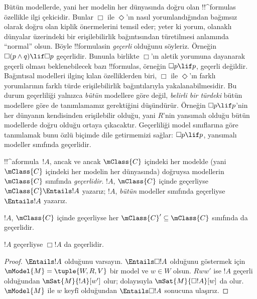 \documentclass[../../../include/open-logic-section]{subfiles}
\begin{document}


\begin{explain}
  Bütün modellerde, yani her modelin her dünyasında doğru olan
  !!^{formula}s özellikle ilgi çekicidir. Bunlar $\Box$ ile $\Diamond$'ın
  nasıl yorumlandığından bağımsız olarak doğru olan kiplik önermelerini
  temsil eder; yeter ki yorum, olanaklı dünyalar üzerindeki bir
  erişilebilirlik bağıntısından türetilmesi anlamında ``normal'' olsun. Böyle
  !!{formula}s{}in \emph{geçerli} olduğunu söyleriz. Örneğin
  $\Box(p \land q) \lif \Box p$ geçerlidir. Bununla birlikte $\Box$'ın
  aletik yorumuna dayanarak geçerli olması beklenebilecek bazı !!{formula}s,
  örneğin $\Box p \lif p$, geçerli değildir. Bağıntısal modelleri ilginç
  kılan özelliklerden biri, $\Box$ ile $\Diamond$'ın farklı yorumlarının
  farklı türde erişilebilirlik bağıntılarıyla yakalanabilmesidir. Bu durum
  geçerliliği yalnızca \emph{bütün} modellere göre değil, \emph{belirli bir
  türdeki} bütün modellere göre de tanımlamamız gerektiğini düşündürür.
  Örneğin $\Box p \lif p$'nin her dünyanın kendisinden erişilebilir olduğu,
  yani $R$'nin yansımalı olduğu bütün modellerde doğru olduğu ortaya
  çıkacaktır. Geçerliliği model sınıflarına göre tanımlamak bunu özlü biçimde
  dile getirmemizi sağlar: $\Box p \lif p$, yansımalı modeller sınıfında
  geçerlidir.
\end{explain}

\begin{defn}
  !!^a{formula}~$!A$, ancak ve ancak $\mClass{C}$ içindeki her modelde
  (yani $\mClass{C}$ içindeki her modelin her dünyasında) doğruysa modellerin
  $\mClass{C}$ sınıfında \emph{geçerlidir}. $!A$, $\mClass{C}$ içinde
  geçerliyse $\mClass{C} \Entails !A$ yazarız; $!A$, \emph{bütün}
  modeller sınıfında geçerliyse $\Entails !A$ yazarız.
\end{defn}

\begin{prop}
  $!A$, $\mClass{C}$ içinde geçerliyse her
  $\mClass{C}' \subseteq \mClass{C}$ sınıfında da geçerlidir.
\end{prop}

\begin{prop}
  $!A$ geçerliyse $\Box!A$ da geçerlidir.
\end{prop}

\begin{proof}
  $\Entails !A$ olduğunu varsayın. $\Entails \Box!A$ olduğunu göstermek
  için $\mModel{M} = \tuple{W, R, V}$ bir model ve $w \in W$ olsun.
  $Rww'$ ise $!A$ geçerli olduğundan $\mSat{M}{!A}[w']$ olur; dolayısıyla
  $\mSat{M}{\Box!A}[w]$ da olur. $\mModel{M}$ ile $w$ keyfî olduğundan
  $\Entails \Box!A$ sonucuna ulaşırız.
\end{proof}
\end{document}
